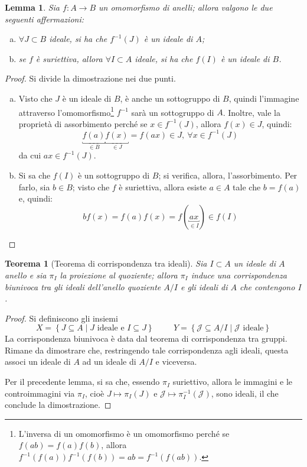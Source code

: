 \documentclass[11pt]{article}
\theoremstyle{style}
\newtheorem{teorema}{Teorema}[section]
\newtheorem{lemma}{Lemma}[teorema]
\numberwithin{equation}{subsection}
\begin{document}
\begin{lemma}
	Sia $f: A\to B$ un omomorfismo di anelli; allora valgono le due seguenti affermazioni:
\begin{enumerate}[(a).]
	\item $\forall J \subset B$ ideale, si ha che $f^{-1}(J)$ \`e un ideale di $A$;
	\item se $f$ \`e suriettiva, allora $\forall I \subset A$ ideale, si ha che $f(I)$ \`e un ideale di $B$.
\end{enumerate}
\end{lemma}
		\begin{proof}
			Si divide la dimostrazione nei due punti.
			\begin{enumerate}[(a).]
				\item Visto che $J$ \`e un ideale di $B$, \`e anche un sottogruppo di $B$, quindi l'immagine attraverso l'omomorfismo\footnote{L'inversa di un omomorfismo \`e un omomorfismo perch\'e se $f(ab) = f(a)f(b)$, allora $f^{-1}(f(a)) f^{-1}(f(b)) =ab= f^{-1}(f(ab))$.} $f^{-1}$ sar\`a un sottogruppo di $A$.
					Inoltre, vale la propriet\`a di assorbimento perch\'e se $x \in f^{-1}(J)$, allora $f(x) \in J$, quindi:
					\[
						\underbracket{f(a)}_{\in B} \underbracket{f(x)}_{\in J}  = f(ax) \in J, \ \forall x \in f^{-1}(J)
					\] 
					da cui $ax \in f^{-1}(J)$.
				\item Si sa che $f(I)$ \`e un sottogruppo di $B$; si verifica, allora, l'assorbimento. 
					Per farlo, sia $b \in B$; visto che $f$ \`e suriettiva, allora esiste $a \in A $ tale che $b = f(a)$ e, quindi:
					\[
						b f(x) = f(a) f(x) = f(\underbracket{ax}_{\in I} ) \in f(I)
					\] 
			\end{enumerate}
		\end{proof}
\begin{teorema}
	[Teorema di corrispondenza tra ideali]
	Sia $I \subset A$ un ideale di $A$ anello e sia $\pi_I$ la proiezione al quoziente; allora $\pi_I$ induce una corrispondenza biunivoca tra gli ideali dell'anello quoziente $A / I$ e gli ideali di $A$ che contengono $I$.
\end{teorema}
	\begin{proof}
		Si definiscono gli insiemi 
		\[
		X = \left\{ J \subseteq A  \mid J \text{ ideale e } I \subseteq J\right\} \hspace{1cm}Y = \left\{ \mathcal{J} \subseteq A / I  \mid \mathcal{J} \text{ ideale} \right\} 
		\] 
		La corrispondenza biunivoca \`e data dal teorema di corrispondenza tra gruppi. 
		Rimane da dimostrare che, restringendo tale corrispondenza agli ideali, questa associ un ideale di $A$ ad un ideale di $A / I$ e viceversa.

		Per il precedente lemma, si sa che, essendo $\pi_I$ suriettivo, allora le immagini e le controimmagini via $\pi_I$, cio\`e $J \longmapsto \pi_I (J)$ e $ \mathcal{J} \longmapsto \pi^{-1}_I(\mathcal{J} )$, sono ideali, il che conclude la dimostrazione.
	\end{proof}
\end{document}
